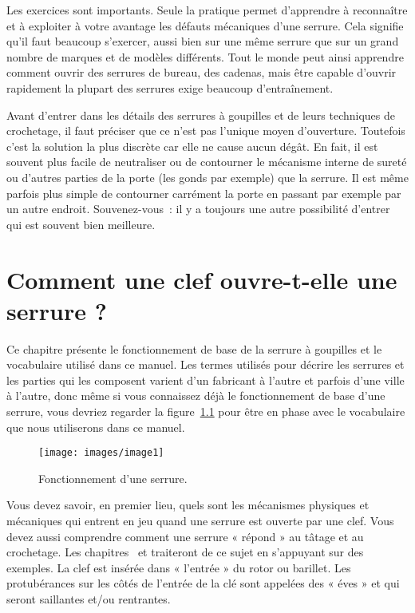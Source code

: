 \documentclass[a4paper,french,11pt,twoside]{report}
\begin{document}
Les exercices sont importants. Seule la pratique permet d'apprendre à reconnaître et à exploiter à votre avantage les défauts mécaniques d'une serrure. Cela signifie qu'il faut beaucoup s'exercer, aussi bien sur une même serrure que sur un grand nombre de marques et de modèles différents. Tout le monde peut ainsi apprendre comment ouvrir des serrures de bureau, des cadenas, mais être capable d'ouvrir rapidement la plupart des serrures exige beaucoup d'entraînement.

Avant d'entrer dans les détails des serrures à goupilles et de leurs techniques de crochetage, il faut préciser que ce n'est pas l'unique moyen d'ouverture. Toutefois c'est la solution la plus discrète car elle ne cause aucun dégât. En fait, il est souvent plus facile de neutraliser ou de contourner le mécanisme interne de sureté ou d'autres parties de la porte (les gonds par exemple) que la serrure. Il est même parfois plus simple de contourner carrément la porte en passant par exemple par un autre endroit. Souvenez-vous~: il y a toujours une autre possibilité d'entrer qui est souvent bien meilleure.

\chapter{\label{chap:comment_clef_serrure}Comment une clef ouvre-t-elle une serrure ?}
Ce chapitre présente le fonctionnement de base de la serrure à goupilles et le vocabulaire utilisé dans ce manuel. Les termes utilisés pour décrire les serrures et les parties qui les composent varient d'un fabricant à l'autre et parfois d'une ville à l'autre, donc même si vous connaissez déjà le fonctionnement de base d'une serrure, vous devriez regarder la figure~\ref{fonctionnement_serrure} pour être en phase avec le vocabulaire que nous utiliserons dans ce manuel.

\begin{figure}[ht]
  \texttt{[image: images/image1]}
  \caption{Fonctionnement d'une serrure.\label{fonctionnement_serrure}}
\end{figure}

Vous devez savoir, en premier lieu, quels sont les mécanismes physiques et mécaniques qui entrent en jeu quand une serrure est ouverte par une clef. Vous devez aussi comprendre comment une serrure « répond » au tâtage et au crochetage. Les chapitres~ et  traiteront de ce sujet en s'appuyant sur des exemples.
La clef est insérée dans « l'entrée » du rotor ou barillet. Les protubérances sur les côtés de l'entrée de la clé sont appelées des « éves » et qui seront saillantes et/ou rentrantes.
\end{document}
